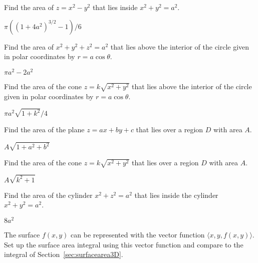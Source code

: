 \begin{enumialphparenastyle}
\begin{ex}
Find the area of $z=x^2-y^2$ that lies inside $x^2+y^2=a^2$.
\begin{sol}
	$\pi((1+4a^2)^{3/2}-1)/6$
\end{sol}
\end{ex}

\begin{ex}
Find the area of $x^2+y^2+z^2=a^2$ 
that lies above the interior of the circle given in polar coordinates
by $r=a\cos \theta$.
\begin{sol}
	$\pi a^2-2a^2$
\end{sol}
\end{ex}

\begin{ex}
Find the area of the cone $z=k\sqrt{x^2+y^2}$
that lies above the interior of the circle given in polar coordinates
by $r=a\cos \theta$.
\begin{sol}
	$\pi a^2\sqrt{1+k^2}/4$
\end{sol}
\end{ex}

\begin{ex}
Find the area of the plane $z=ax+by+c$ that lies over a
region $D$ with area $A$.
\begin{sol}
	$A\sqrt{1+a^2+b^2}$
\end{sol}
\end{ex}

\begin{ex}
Find the area of the cone $z=k\sqrt{x^2+y^2}$ that lies over a
region $D$ with area $A$.
\begin{sol}
	$A\sqrt{k^2+1}$
\end{sol}
\end{ex}

\begin{ex}
Find the area of the cylinder $x^2+z^2=a^2$ that lies inside
the cylinder $x^2+y^2=a^2$.
\begin{sol}
	$8a^2$
\end{sol}
\end{ex}

\begin{ex}
The surface $f(x,y)$ can be represented with the vector
function $\langle x,y,f(x,y)\rangle$. Set up the surface area integral using
this vector function and compare to the integral of
Section~\ref{sec:surfacearea3D}. 
\end{ex}

\end{enumialphparenastyle}
